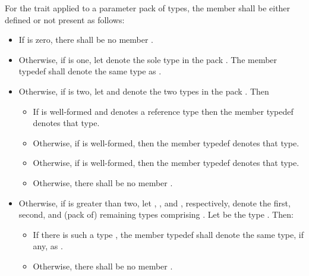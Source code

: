 {\color{newclr}
\pnum
For the  trait applied to a parameter pack  of
types, the member  shall be either defined or not present as follows:
\begin{itemize}
\item If  is zero, there shall be no member .
\item Otherwise, if  is one, let  denote the sole
  type in the pack . The member typedef  shall denote the
  same type as .
\item Otherwise, if  is two, let  and 
  denote the two types in the pack . Then
\begin{itemize}
\item If  is well-formed and denotes a reference type
  then the member typedef  denotes that type.
\item Otherwise, if  is well-formed, then the member typedef
   denotes that type.
\item Otherwise, if  is well-formed, then the
  member typedef  denotes that type.
\item Otherwise, there shall be no member .
\end{itemize}
\item Otherwise, if  is greater than two, let ,
  , and , respectively, denote the first, second, and
  (pack of) remaining types comprising . Let  be the type
  . Then:
\begin{itemize}
\item If there is such a type , the member typedef  shall
  denote the same type, if any, as .
\item Otherwise, there shall be no member .
\end{itemize}
\end{itemize}
} %

\setcounter{section}{14}

